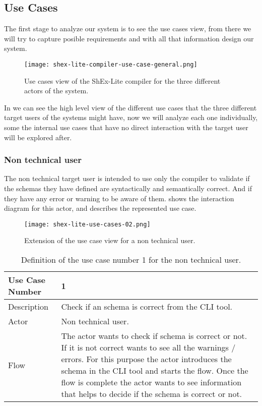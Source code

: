 \subsection{Use Cases}
The first stage to analyze our system is to see the use cases view, from there we will try to capture
posible requirements and with all that information design our system.

\begin{figure}[hb]
    \texttt{[image: shex-lite-compiler-use-case-general.png]}
    \caption[Use cases view of the ShEx-Lite compiler for the three different 
    actors of the system]{Use cases view of the ShEx-Lite compiler for the three different actors of the system.}
\end{figure}

In  we can see the high level view of the different use cases that 
the three different target users of the systems might have, now we will analyze each one individually,
some the internal use cases that have no direct interaction with the target user will be explored after.

\subsubsection{Non technical user}
The non technical target user is intended to use only the compiler to validate if the schemas they
have defined are syntactically and semantically correct. And if they have any error or warning to be
aware of them.  shows the interaction diagram for this actor, and
 describes the represented use case.

\begin{figure}[hb]
    \texttt{[image: shex-lite-use-cases-02.png]}
    \caption[Extension of the use case view for a non technical user]{Extension of the use 
    case view for a non technical user.}
\end{figure}

\begin{table}[hb]
    \begin{tabular}{ | m{2cm} | m{8cm}| }
        \hline
        Use Case Number & 1 \\
        \hline
        Description & Check if an schema is correct from the CLI tool. \\
        \hline
        Actor & Non technical user. \\
        \hline
        Flow & The actor wants to check if schema is correct or not. If it is not correct wants to see all 
        the warnings / errors. For this purpose the actor introduces the schema in the CLI tool and starts 
        the flow. Once the flow is complete the actor wants to see information that helps to decide if the 
        schema is correct or not. \\
        \hline
    \end{tabular}
    \caption[Definition of the use case number 1 for the non technical user]{Definition of the use case number 
    1 for the non technical user.}
\end{table}

